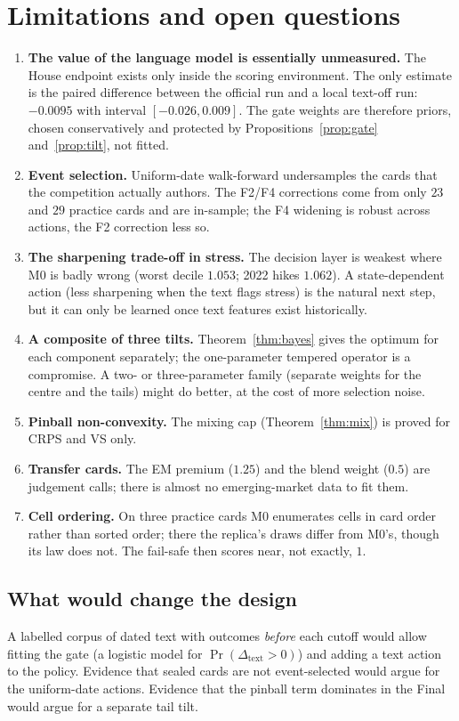 \section{Limitations and open questions}\label{sec:limitations}

\begin{enumerate}[leftmargin=*]
\item \textbf{The value of the language model is essentially unmeasured.} The House endpoint exists only inside the scoring environment. The
only estimate is the paired difference between the official run and a local text-off run: $-0.0095$ with interval $[-0.026,0.009]$. The gate
weights are therefore priors, chosen conservatively and protected by Propositions~\ref{prop:gate} and~\ref{prop:tilt}, not fitted.
\item \textbf{Event selection.} Uniform-date walk-forward undersamples the cards that the competition actually authors. The F2/F4 corrections come
from only $23$ and $29$ practice cards and are in-sample; the F4 widening is robust across actions, the F2 correction less so.
\item \textbf{The sharpening trade-off in stress.} The decision layer is weakest where M0 is badly wrong (worst decile $1.053$; 2022 hikes $1.062$).
A state-dependent action (less sharpening when the text flags stress) is the natural next step, but it can only be learned once text features
exist historically.
\item \textbf{A composite of three tilts.} Theorem~\ref{thm:bayes} gives the optimum for each component separately; the one-parameter tempered
operator is a compromise. A two- or three-parameter family (separate weights for the centre and the tails) might do better, at the cost of more
selection noise.
\item \textbf{Pinball non-convexity.} The mixing cap (Theorem~\ref{thm:mix}) is proved for CRPS and VS only.
\item \textbf{Transfer cards.} The EM premium ($1.25$) and the blend weight ($0.5$) are judgement calls; there is almost no emerging-market data to fit them.
\item \textbf{Cell ordering.} On three practice cards M0 enumerates cells in card order rather than sorted order; there the replica's draws differ
from M0's, though its law does not. The fail-safe then scores near, not exactly, $1$.
\end{enumerate}

\subsection{What would change the design}

A labelled corpus of dated text with outcomes \emph{before} each cutoff would allow fitting the gate (a logistic model for $\Pr(\Delta_{\text{text}}>0)$)
and adding a text action to the policy. Evidence that sealed cards are not event-selected would argue for the uniform-date actions. Evidence that
the pinball term dominates in the Final would argue for a separate tail tilt.
